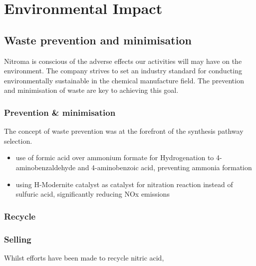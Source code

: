 \section{Environmental Impact}

\subsection{Waste prevention and minimisation }

Nitroma is conscious of the adverse effects our activities will may have on the environment. The company strives to set an industry standard for conducting environmentally sustainable in the chemical manufacture field. The prevention and minimisation of waste are key to achieving this goal. 

\subsubsection{Prevention \& minimisation}

The concept of waste prevention was at the forefront of the synthesis pathway selection. 

\begin{itemize}
    \item use of formic acid over ammonium formate for Hydrogenation to 4-aminobenzaldehyde and 4-aminobenzoic acid, preventing ammonia formation 
    \item using H-Modernite catalyst as catalyst for nitration reaction instead of sulfuric acid, significantly reducing NOx emissions
\end{itemize}



\subsubsection{Recycle}





\subsubsection{Selling}

Whilst efforts have been made to recycle nitric acid, 